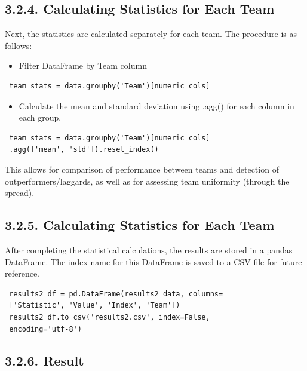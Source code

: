 \documentclass[a4paper,12pt]{article}
\begin{document}
\subsection*{\textbf{3.2.4. Calculating Statistics for Each Team }}
Next, the statistics are calculated separately for each team. The procedure is as follows:
\begin{itemize}
    \item {Filter DataFrame by Team column}  
\end{itemize}  
\begin{mdframed}
\begin{verbatim}
 team_stats = data.groupby('Team')[numeric_cols]
\end{verbatim}
\end{mdframed}
\begin{itemize}
    \item {Calculate the mean and standard deviation using .agg() for each column in each group.
    }  
\end{itemize}

\begin{mdframed}
\begin{verbatim}
 team_stats = data.groupby('Team')[numeric_cols]
 .agg(['mean', 'std']).reset_index()
\end{verbatim}
\end{mdframed}
This allows for comparison of performance between teams and detection of outperformers/laggards, as well as for assessing team uniformity (through the spread).
\subsection*{\textbf{3.2.5. Calculating Statistics for Each Team }}
After completing the statistical calculations, the results are stored in a pandas DataFrame. The index name for this DataFrame is saved to a CSV file for future reference.
\begin{mdframed}
\begin{verbatim}
 results2_df = pd.DataFrame(results2_data, columns=
 ['Statistic', 'Value', 'Index', 'Team'])
 results2_df.to_csv('results2.csv', index=False,
 encoding='utf-8')
\end{verbatim}
\end{mdframed}
\subsection*{\textbf{3.2.6. Result}}
\end{document}
